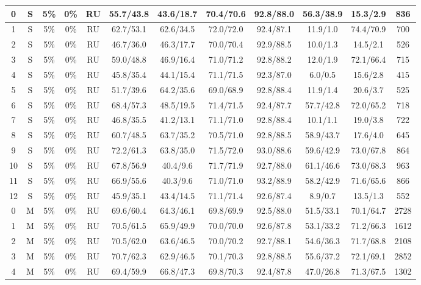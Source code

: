 \begin{table*}
{\begin{tabular}{|c|c|c|c|c||c|c|c|c|c|c||c|}
0 & S & 5\% & 0\% & RU & 55.7/43.8 & 43.6/18.7 & 70.4/70.6 & 92.8/88.0 & 56.3/38.9 & 15.3/2.9 & 836 \\ \hline
1 & S & 5\% & 0\% & RU & 62.7/53.1 & 62.6/34.5 & 72.0/72.0 & 92.4/87.1 & 11.9/1.0 & 74.4/70.9 & 700 \\ \hline
2 & S & 5\% & 0\% & RU & 46.7/36.0 & 46.3/17.7 & 70.0/70.4 & 92.9/88.5 & 10.0/1.3 & 14.5/2.1 & 526 \\ \hline
3 & S & 5\% & 0\% & RU & 59.0/48.8 & 46.9/16.4 & 71.0/71.2 & 92.8/88.2 & 12.0/1.9 & 72.1/66.4 & 715 \\ \hline
4 & S & 5\% & 0\% & RU & 45.8/35.4 & 44.1/15.4 & 71.1/71.5 & 92.3/87.0 & 6.0/0.5 & 15.6/2.8 & 415 \\ \hline
5 & S & 5\% & 0\% & RU & 51.7/39.6 & 64.2/35.6 & 69.0/68.9 & 92.8/88.4 & 11.9/1.4 & 20.6/3.7 & 525 \\ \hline
6 & S & 5\% & 0\% & RU & 68.4/57.3 & 48.5/19.5 & 71.4/71.5 & 92.4/87.7 & 57.7/42.8 & 72.0/65.2 & 718 \\ \hline
7 & S & 5\% & 0\% & RU & 46.8/35.5 & 41.2/13.1 & 71.1/71.0 & 92.8/88.4 & 10.1/1.1 & 19.0/3.8 & 722 \\ \hline
8 & S & 5\% & 0\% & RU & 60.7/48.5 & 63.7/35.2 & 70.5/71.0 & 92.8/88.5 & 58.9/43.7 & 17.6/4.0 & 645 \\ \hline
9 & S & 5\% & 0\% & RU & 72.2/61.3 & 63.8/35.0 & 71.5/72.0 & 93.0/88.6 & 59.6/42.9 & 73.0/67.8 & 864 \\ \hline
10 & S & 5\% & 0\% & RU & 67.8/56.9 & 40.4/9.6 & 71.7/71.9 & 92.7/88.0 & 61.1/46.6 & 73.0/68.3 & 963 \\ \hline
11 & S & 5\% & 0\% & RU & 66.9/55.6 & 40.3/9.6 & 71.0/71.0 & 93.2/88.9 & 58.2/42.9 & 71.6/65.6 & 866 \\ \hline
12 & S & 5\% & 0\% & RU & 45.9/35.1 & 43.4/14.5 & 71.1/71.4 & 92.6/87.4 & 8.9/0.7 & 13.5/1.3 & 552 \\ \hline
0 & M & 5\% & 0\% & RU & 69.6/60.4 & 64.3/46.1 & 69.8/69.9 & 92.5/88.0 & 51.5/33.1 & 70.1/64.7 & 2728 \\ \hline
1 & M & 5\% & 0\% & RU & 70.5/61.5 & 65.9/49.9 & 70.0/70.0 & 92.6/87.8 & 53.1/33.2 & 71.2/66.3 & 1612 \\ \hline
2 & M & 5\% & 0\% & RU & 70.5/62.0 & 63.6/46.5 & 70.0/70.2 & 92.7/88.1 & 54.6/36.3 & 71.7/68.8 & 2108 \\ \hline
3 & M & 5\% & 0\% & RU & 70.7/62.3 & 62.9/46.5 & 70.1/70.3 & 92.8/88.5 & 55.6/37.2 & 72.1/69.1 & 2852 \\ \hline
4 & M & 5\% & 0\% & RU & 69.4/59.9 & 66.8/47.3 & 69.8/70.3 & 92.4/87.8 & 47.0/26.8 & 71.3/67.5 & 1302 \\ \hline

\end{tabular}}
\end{table*}
